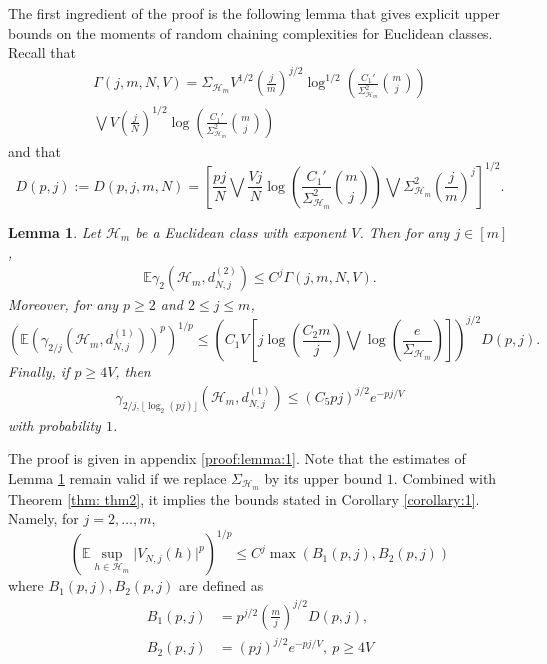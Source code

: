 \documentclass[12pt]{article}
\def\l{\left}
\def\r{\right}
\newcommand{\m}{\mathcal}
\newcommand{\mb}{\mathbb}
\newtheorem{lemma}{Lemma}
\theoremstyle{thmstyletwo}%
\theoremstyle{thmstylethree}%
\begin{document}
The first ingredient of the proof is the following lemma that gives explicit upper bounds on the moments of random chaining complexities for Euclidean classes. Recall that 
\begin{multline*}
 \Gamma(j,m,N,V) =  \Sigma_{\m H_m} V^{1/2}\l(\frac{j}{m}\r)^{j/2} \log^{1/2} \l(\frac{C_1'}{\Sigma_{\m H_m}^2}{m \choose j}\r)
 \\
 \bigvee  V\l(\frac{j}{N}\r)^{1/2} \log\l(\frac{C_1'}{\Sigma_{\m H_m}^2}{m \choose j}\r)
\end{multline*}
and that  
\[
D(p,j):=D(p,j,m,N) = \l[\frac{pj}{N}\bigvee \frac{Vj}{N}\log\l(\frac{C_1'}{\Sigma_{\m H_m}^2}{m \choose j}\r)\bigvee \Sigma^2_{\m H_m}\l(\frac{j}{m}\r)^{j} \r]^{1/2}.
\]
\begin{lemma}
\label{lemma:1}
    Let $\mathcal{H}_m$ be a Euclidean class with exponent $V$. Then for any $j \in [m]$, 
    \begin{align}\label{eq:E_gamma_2}
    \mb E \gamma_{2} \l(\mathcal{H}_m, d^{(2)}_{N,j}\r) \leq C^j\Gamma(j,m,N,V).
    \end{align}
    Moreover, for any $p \geq 2$ and $2 \leq j \leq m$,  
    \begin{equation}
    \label{eq:truncated_gamma_bound_1}
    \l(\mb E \l(\gamma_{2/j} (\mathcal{H}_m, d^{(1)}_{N,j}) \r)^p\r)^{1/p} 
    \leq \l(C_1V \l[j\log\l(\frac{C_2m}{j}\r) \bigvee \log\l( \frac{e}{\Sigma_{\m H_m}}\r)\r]\r)^{j/2}D(p,j).
    \end{equation}
    Finally, if $p \geq 4V$, then  
    \begin{align}
    \label{eq:truncated_gamma_bound_2}
        \gamma_{2/j, \lfloor \log_2 (pj) \rfloor}(\mathcal{H}_m, d^{(1)}_{N,j}) \leq 
        (C_5 pj)^{j/2} e^{-pj/V}
    \end{align}
    with probability $1$.
\end{lemma}
\noindent The proof is given in appendix \ref{proof:lemma:1}. Note that the estimates of Lemma \ref{lemma:1} remain valid if we replace $\Sigma_{\m H_m}$ by its upper bound $1$. 
Combined with Theorem \ref{thm: thm2}, it implies the bounds stated in Corollary \ref{corollary:1}. Namely, for $j=2,\ldots,m$, 
\[
\l(\mb E \sup_{h \in \mathcal{H}_m} \lvert V_{N,j}(h) \rvert^p \r)^{1/p}\leq C^j\max\l(B_1(p,j),B_2(p,j) \r)
\]
where $B_1(p,j),B_2(p,j)$ are defined as
\begin{align*}
B_1(p,j) &= p^{j/2}\l(\frac{m}{j}\r)^{j/2} D(p,j), 
\\
B_2(p,j) &= (pj)^{j/2} e^{-pj/V}, \ p\geq 4V
\end{align*}
\end{document}

